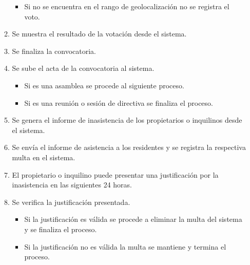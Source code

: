 \begin{itemize}
\begin{enumerate}
\begin{itemize}
            \item Si no se encuentra en el rango de geolocalización no se registra el voto.
        \end{itemize}
        \item Se muestra el resultado de la votación desde el sistema.
        \item Se finaliza la convocatoria.
        \item Se sube el acta de la convocatoria al sistema.
        \begin{itemize}
            \item Si es una asamblea se procede al siguiente proceso.
            \item Si es una reunión o sesión de directiva se finaliza el proceso.
        \end{itemize}
        \item Se genera el informe de inasistencia de los propietarios o inquilinos desde el sistema.
        \item Se envía el informe de asistencia a los residentes y se registra la respectiva multa en el sistema.
        \item El propietario o inquilino puede presentar una justificación por la inasistencia en las siguientes 24 horas.
        \item Se verifica la justificación presentada.
        \begin{itemize}
            \item Si la justificación es válida se procede a eliminar la multa del sistema y se finaliza el proceso.
            \item Si la justificación no es válida la multa se mantiene y termina el proceso.
        \end{itemize}
    \end{enumerate}
    \begin{figure}[H]
        \centering

\end{figure}
\end{itemize}
